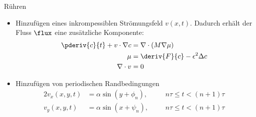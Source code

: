 \begin{frame}{Rühren}
\begin{itemize}
\item Hinzufügen eines inkrompessiblen Strömungsfeld $v(x, t)$.
Dadurch erhält der Fluss $\flux$ eine zusätzliche Komponente:
\begin{align*}
\pderiv{c}{t} + v \cdot \nabla c
&=
\nabla \cdot (M \nabla \mu)
\\
\mu
&=
\deriv{F}{c} -  \epsilon^2 \Delta c
\\
\nabla \cdot v
&=
0
\end{align*}
\item Hinzufügen von periodischen Randbedingungen
\begin{alignat*}{2}
v_x(x, y, t)
&=
\alpha \sin(y + \phi_n)
,\quad&
& n \tau \leq t < (n+1) \tau
\\
v_y(x, y, t)
&=
\alpha \sin(x + \psi_n)
,&
& n \tau \leq t < (n+1) \tau
\end{alignat*}
\end{itemize}
\end{frame}


